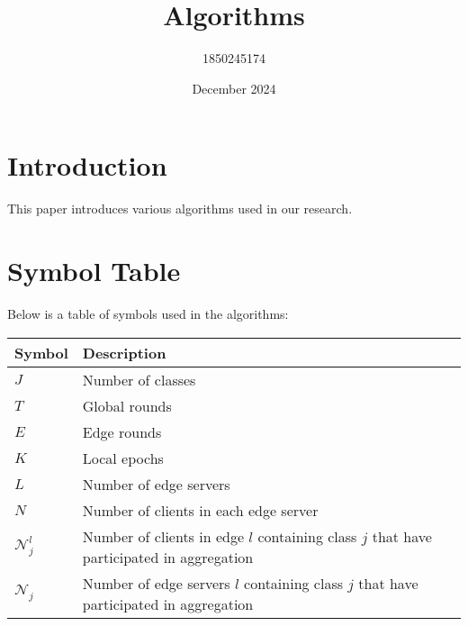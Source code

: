 \documentclass{article}
\title{Algorithms}
\author{1850245174 }
\date{December 2024}
\begin{document}
\maketitle

\section{Introduction}

This paper introduces various algorithms used in our research.


\section{Symbol Table}

Below is a table of symbols used in the algorithms:

\begin{table}[h!]
    \centering
    \begin{tabular}{@{}lp{10cm}@{}}
        \toprule
        \textbf{Symbol}                & \textbf{Description}                                                                                             \\
        \midrule
        \( J \)                        & Number of classes                                                                                                \\
        \( T \)                        & Global rounds                                                                                                    \\
        \( E \)                        & Edge rounds                                                                                                      \\
        \( K \)                        & Local epochs                                                                                                     \\
        \( L \)                        & Number of edge servers                                                                                           \\
        \( N \)                        & Number of clients in each edge server                                                                            \\
        \( \mathcal{N}_j^l  \)         & Number of clients in edge $l$ containing class $j$ that have participated in aggregation                         \\
        \( \mathcal{N}_j  \)           & Number of edge servers $l$ containing class $j$ that have participated in aggregation                            \\


\end{tabular}
\end{table}
\end{document}
